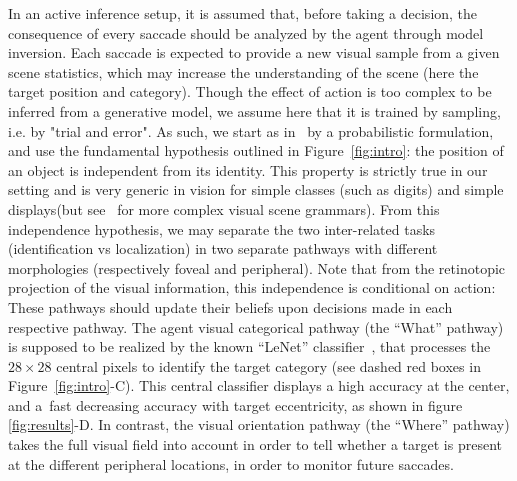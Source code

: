 \CNS
In an active inference setup, it is assumed that, before taking a decision, the consequence of every saccade should be analyzed by the agent through model inversion. Each saccade is expected to provide a new visual sample from a given scene statistics, which may increase the understanding of the scene (here the target position and category). Though the effect of action is too complex to be inferred from a generative model, we assume here that it is trained by sampling, i.e. by "trial and error". 
As such, we start as in~\citep{Friston12} by a probabilistic formulation, and use the fundamental hypothesis outlined in Figure~\ref{fig:intro}: the position of an object is independent from its identity. This property is strictly true in our setting and is very generic in vision for simple classes (such as digits) and simple displays\CNS (but see~\citep{Vo12} for more complex visual scene grammars)\fi . From this independence hypothesis, we may separate the two inter-related tasks (identification vs localization) in two separate pathways with different morphologies (respectively foveal and peripheral). Note that from the retinotopic projection of the visual information, this independence is conditional on action: These pathways should update their beliefs upon decisions made in each respective pathway.
The agent visual categorical pathway (the ``What'' pathway) is supposed to be realized by the known ``LeNet'' classifier~\citep{Lecun1998}, that processes the $28 \times 28$ central pixels to identify the target category (see dashed red boxes in  Figure~\ref{fig:intro}-C). This central classifier displays a high accuracy at the center, and a fast decreasing accuracy with target eccentricity, as shown in figure \ref{fig:results}-D. In contrast, the visual orientation pathway (the ``Where'' pathway) takes the full visual field into account in order to tell whether a target is present at the different peripheral locations, in order to monitor future saccades. 

